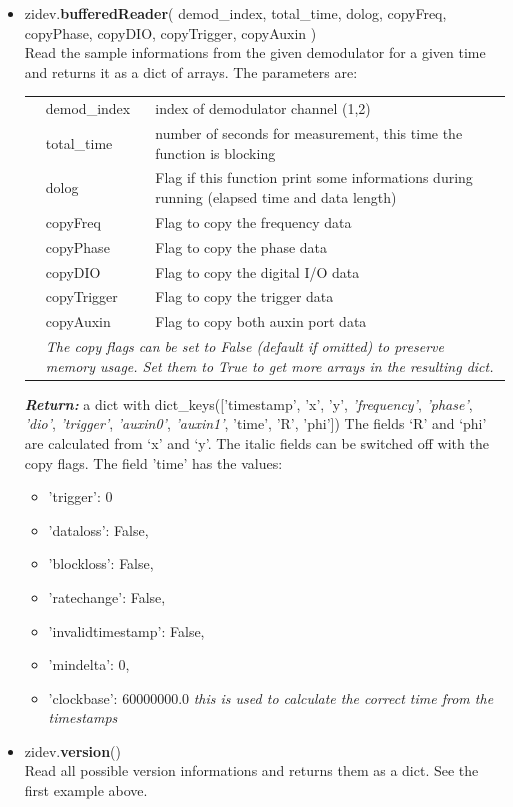 \documentclass[11pt]{article} %
\begin{document}
\begin{itemize}
\item zidev.{\bf bufferedReader}( demod\_index, total\_time, dolog, copyFreq, copyPhase, copyDIO, copyTrigger, copyAuxin ) \\
	Read the sample informations from the given demodulator for a given time and returns it as a dict of arrays. The parameters are:
	\begin{longtable}{p{1.5cm}p{3cm}p{12cm}}
	&demod\_index & index of demodulator channel (1,2) \\
	&total\_time  & number of seconds for measurement, this time the function is blocking \\
	&dolog & Flag if this function print some informations during running (elapsed time and data length) \\
	&copyFreq & Flag to copy the frequency data \\
	&copyPhase & Flag to copy the phase data \\
	&copyDIO & Flag to copy the digital I/O data \\
	&copyTrigger & Flag to copy the trigger data \\
	&copyAuxin & Flag to copy both auxin port data \\
	& \multicolumn{2}{p{15cm}}{\it The copy flags can be set to False (default if omitted) to preserve memory usage. Set them to True to get more arrays in the resulting dict.} \\
	\end{longtable}
	\textbf{\textit{Return:}} a dict with dict\_keys(['timestamp', 'x', 'y', {\it 'frequency'}, {\it 'phase'}, {\it 'dio'}, {\it 'trigger'}, {\it 'auxin0'}, {\it 'auxin1'}, 'time', 'R', 'phi'])
	The fields `R' and `phi' are calculated from `x' and `y'. The italic fields can be switched off with the copy flags. The field 'time' has the values:
	\begin{itemize}[ ]
	\itemsep0pt
	\item 'trigger': 0
	\item 'dataloss': False,
	\item 'blockloss': False,
	\item 'ratechange': False,
	\item 'invalidtimestamp': False,
	\item 'mindelta': 0,
	\item 'clockbase': 60000000.0  {\it this is used to calculate the correct time from the timestamps}
  	\end{itemize}

\item zidev.{\bf version}() \\
  	Read all possible version informations and returns them as a dict. See the first example above.


\end{itemize}
\end{document}
